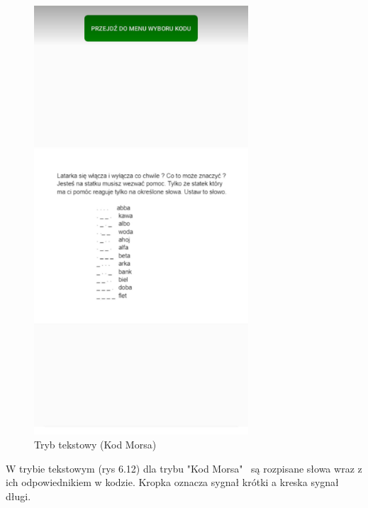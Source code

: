 	\begin{figure}[!htb]
	\begin{center}
		\includegraphics[width=8cm]{rys/tekstowy3.png}
		\caption{Tryb tekstowy (Kod Morsa)}
		\label{rys:rysunek001}
	\end{center}
\end{figure}
\hspace{-0.60cm}W trybie tekstowym (rys 6.12) dla trybu "Kod Morsa"~ są rozpisane słowa wraz z ich odpowiednikiem w kodzie. Kropka oznacza sygnał krótki a kreska sygnał długi.
\\
\\
\\
\\
\\
